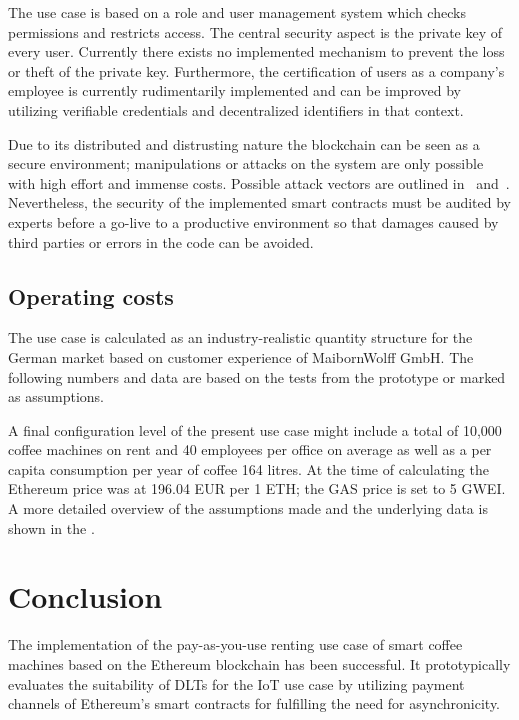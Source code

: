 \documentclass[conference]{IEEEtran}
\begin{document}
The use case is based on a role and user management system which checks permissions and restricts access. The central security aspect is the private key of every user. Currently there exists no implemented mechanism to prevent the loss or theft of the private key. Furthermore, the certification of users as a company's employee is currently rudimentarily implemented and can be improved by utilizing verifiable credentials and decentralized identifiers in that context.

Due to its distributed and distrusting nature the blockchain can be seen as a secure environment; manipulations or attacks on the system are only possible with high effort and immense costs. Possible attack vectors are outlined in~\cite{EthereumSecurity} and~\cite{BlockchainSecurity}. Nevertheless, the security of the implemented smart contracts must be audited by experts before a go-live to a productive environment so that damages caused by third parties or errors in the code can be avoided.

%
\subsection{Operating costs}

The use case is calculated as an industry-realistic quantity structure for the German market based on customer experience of MaibornWolff GmbH. The following numbers and data are based on the tests from the prototype or marked as assumptions.

A final configuration level of the present use case might include a total of 10,000 coffee machines on rent and 40 employees per office on average as well as a per capita consumption per year of coffee 164 litres. At the time of calculating the Ethereum price was at 196.04 EUR per 1 ETH; the GAS price is set to 5 GWEI. A more detailed overview of the assumptions made and the underlying data is shown in the .

%
\section{Conclusion}

The implementation of the pay-as-you-use renting use case of smart coffee machines based on the Ethereum blockchain has been successful. It prototypically evaluates the suitability of DLTs for the IoT use case by utilizing payment channels of Ethereum's smart contracts for fulfilling the need for asynchronicity.
\end{document}
